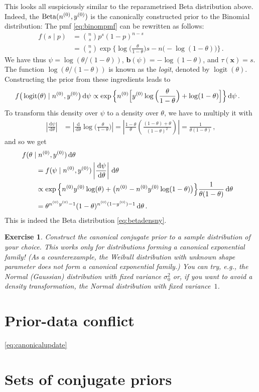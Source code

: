 \documentclass[12pt,a4paper	,twoside]{article}
\newcommand{\dd}{\,\mathrm{d}}
\newcommand{\mbf}[1]{\mathbf{#1}}
\newcommand{\bs}[1]{\boldsymbol{#1}}
\renewcommand{\vec}[1]{{\bs#1}}
\newcommand{\be}{\operatorname{Beta}}
\newcommand{\logit}{\operatorname{logit}} %
\newtheorem{myex}{Exercise}
\begin{document}
This looks all suspiciously similar to the reparametrised Beta distribution above.
Indeed, the $\be(\nz,\yz)$ is the canonically constructed prior to the Binomial distribution:
The pmf \eqref{eq:binompmf} can be rewritten as follows:
\begin{align}
f(s\mid p)
 &= {n \choose s} p^s (1-p)^{n-s} \\
 &= {n \choose s} \exp\Big\{ \log\Big(\frac{\theta}{1-\theta}\Big) s - n \big(-\log(1-\theta)\big) \Big\} \,.
\end{align}
We have thus $\psi = \log(\theta/(1-\theta))$, $\mbf{b}(\psi) = -\log(1-\theta)$, and $\tau(\vec{x}) = s$.
The function $\log(\theta/(1-\theta))$ is known as the \emph{logit}, denoted by $\logit(\theta)$.
Constructing the prior from these ingredients leads to
\begin{align}
f\big(\logit(\theta) \mid \nz, \yz\big) \dd\psi %
 &\propto \exp\Big\{ \nz \Big[ \yz \log\Big(\frac{\theta}{1-\theta}\Big) + \log(1-\theta) \Big] \Big\} \dd\psi\,.
\end{align}
To transform this density over $\psi$ to a density over $\theta$,
we have to multiply it with
\begin{align}
\left|\frac{\dd\psi}{\dd\theta}\right|
 &= \left|\frac{\dd}{\dd\theta} \log\Big(\frac{\theta}{1-\theta}\Big)\right|
  = \left| \frac{1-\theta}{\theta}\left(\frac{(1-\theta)+\theta}{(1-\theta)^2}\right) \right|
  = \frac{1}{\theta(1-\theta)}\,,
\end{align}
and so we get
\begin{align}
\lefteqn{f(\theta\mid \nz, \yz)\dd\theta} \qquad \\  
 &= f(\psi\mid \nz, \yz) \left|\frac{\dd\psi}{\dd\theta}\right| \dd\theta\\
 &\propto \exp\Big\{ \nz\yz\log(\theta) + \big(\nz - \nz\yz\log(1-\theta)\big)\Big\} \frac{1}{\theta(1-\theta)}\dd\theta\\
 &= \theta^{\nz\yz - 1} (1-\theta)^{\nz(1-\yz) - 1} \dd\theta\,.
\end{align}
This is indeed the Beta distribution \eqref{eq:betadensny}.%

\begin{myex}
Construct the canonical conjugate prior to a sample distribution of your choice.
This works only for distributions forming a canonical exponential family!
(As a counterexample, the Weibull distribution with unknown shape parameter does not form a canonical exponential family.)
You can try, e.g., the Normal (Gaussian) distribution with fixed variance $\sigma^2_0$
or, if you want to avoid a density transformation, the Normal distribution with fixed variance~$1$.
\end{myex}


\section{Prior-data conflict}

\eqref{eq:canonicalupdate}

\section{Sets of conjugate priors}



\printbibliography
\end{document}
